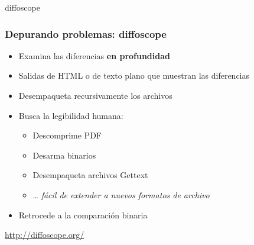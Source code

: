 \documentclass[14pt,aspectratio=169]{beamer}
\begin{document}
\begin{frame}[plain]
\end{frame}

{
\begin{frame}{diffoscope}
 \frametitle{Depurando problemas: diffoscope}

 \begin{itemize}
  \item Examina las diferencias \textbf{en profundidad}
  \item Salidas de HTML o de texto plano que muestran las diferencias
  \item Desempaqueta recursivamente los archivos
  \item Busca la legibilidad humana:
   \begin{itemize}
    \item Descomprime PDF
    \item Desarma binarios
    \item Desempaqueta archivos Gettext
    \item … \textit{fácil de extender a nuevos formatos de archivo}
   \end{itemize}
  \item Retrocede a la comparación binaria
 \end{itemize}
 \vfill
 \begin{center}
  \url{http://diffoscope.org/}\\
  {\footnotesize {}}
 \end{center}
\end{frame}
}
\end{document}
